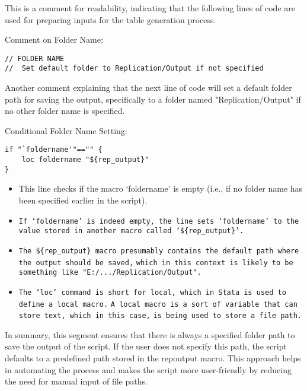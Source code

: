 \documentclass{article}
\begin{document}
This is a comment for readability, indicating that the following lines of code are used for preparing inputs for the table generation process.

Comment on Folder Name:
\begin{mdframed}
\begin{verbatim}
// FOLDER NAME 
// 	Set default folder to Replication/Output if not specified 
\end{verbatim}
\end{mdframed}


Another comment explaining that the next line of code will set a default folder path for saving the output, specifically to a folder named "Replication/Output" if no other folder name is specified.
	
Conditional Folder Name Setting:
\begin{mdframed}
\begin{verbatim}
if "`foldername'"=="" {
	loc foldername "${rep_output}" 
}
\end{verbatim}
\end{mdframed}


\begin{itemize}
    \item This line checks if the macro ‘foldername’ is empty (i.e., if no folder name has been specified earlier in the script).
    \item \texttt{If ‘foldername’ is indeed empty, the line sets ‘foldername’ to the value stored in another macro called ‘\$\{rep\_output\}’.} 
    \item \texttt{The \$\{rep\_output\} macro presumably contains the default path where the output should be saved,} 
    \texttt{which in this context is likely to be something like "E:/.../Replication/Output".}
    \item \texttt{The ‘loc’ command is short for local, which in Stata is used to define a local macro.} 
    \texttt{A local macro is a sort of variable that can store text, which in this case,} 
    \texttt{is being used to store a file path.}
\end{itemize}

In summary, this segment ensures that there is always a specified folder path to save the output of the script. If the user does not specify this path, the script defaults to a predefined path stored in the repoutput macro. This approach helps in automating the process and makes the script more user-friendly by reducing the need for manual input of file paths.
\end{document}
